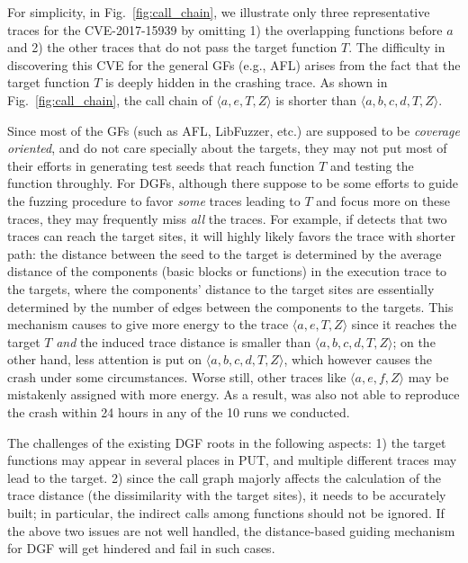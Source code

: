 For simplicity, in Fig.~\ref{fig:call_chain}, we illustrate only three representative traces for the CVE-2017-15939 by omitting 1) the overlapping functions before $a$ and 2) the other traces that do not pass the target function $T$. {The difficulty in discovering this CVE for the general GFs (e.g., AFL) arises from the fact that the target function $T$ is deeply hidden in the crashing trace.} As shown in Fig.~\ref{fig:call_chain}, the call chain of $\langle a, e, T, Z\rangle$ is shorter than $\langle a, b, c, d, T, Z\rangle$.

Since most of the GFs (such as AFL, LibFuzzer, etc.) are supposed to be \emph{coverage oriented}, and do not care specially about the targets, they may not put most of their efforts in generating test seeds that reach function $T$ and testing the function throughly. For DGFs, although there suppose to be some efforts to guide the fuzzing procedure to favor \emph{some} traces leading to $T$ and focus more on these traces, they may frequently miss \emph{all} the traces. For example, if \aflgo detects that two traces can reach the target sites, it will highly likely favors the trace with shorter path: the distance between the seed to the target is determined by the average distance of the components (basic blocks or functions) in the execution trace to the targets, where the components' distance to the target sites are essentially determined by the number of edges between the components to the targets. This mechanism causes \aflgo to give more energy to the trace $\langle a, e, T, Z\rangle$ since it reaches the target $T$ \emph{and} the induced trace distance is smaller than $\langle a, b, c, d, T, Z\rangle$; on the other hand, less attention is put on $\langle a, b, c, d, T, Z\rangle$, which however causes the crash under some circumstances. Worse still, other traces like $\langle a, e, f, Z\rangle$ may be mistakenly assigned with more energy. As a result, \aflgo was also not able to reproduce the crash within 24 hours in any of the 10 runs we conducted.
 
The challenges of the existing DGF roots in the following aspects: 1) the target functions may appear in several places in PUT, and multiple different traces may lead to the target.  2) since the call graph majorly affects the calculation of the trace distance (the dissimilarity with the target sites), it needs to be accurately built;
in particular, the indirect calls among functions should not be ignored. If the above two issues are not well handled, the distance-based guiding mechanism for DGF will get hindered and fail in such cases.








